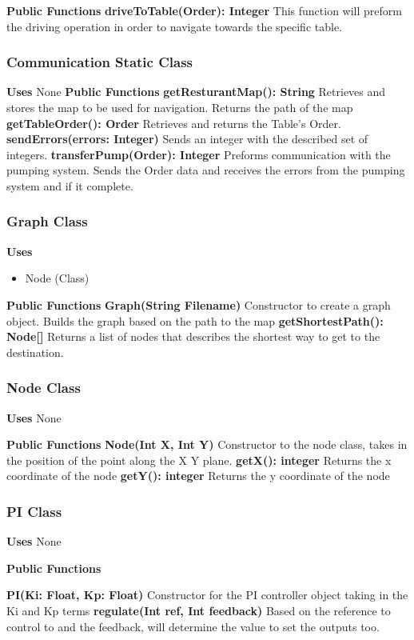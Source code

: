 \documentclass [10pt]{article}
\begin{document}
\textbf{Public Functions}
\textbf{driveToTable(Order): Integer}
This function will preform the driving operation in order to navigate towards the specific table.

\subsubsection{Communication Static Class}
\textbf{Uses}
None 
\textbf{Public Functions}
\textbf{getResturantMap(): String}
Retrieves and stores the map to be used for navigation. Returns the path of the map 
\textbf{getTableOrder(): Order}
Retrieves and returns the Table’s Order.
\textbf{sendErrors(errors: Integer)}
Sends an integer with the described set of integers. 
\textbf{transferPump(Order): Integer}
Preforms communication with the pumping system. Sends the Order data and receives the errors from the pumping system and if it complete.

\subsubsection{Graph Class}
\textbf{Uses}
\begin{itemize}
	\item Node (Class)
\end{itemize}

\textbf{Public Functions}
\textbf{Graph(String Filename)}
Constructor to create a graph object. Builds the graph based on the path to the map
\textbf{getShortestPath(): Node[]}
Returns a list of nodes that describes the shortest way to get to the destination. 


\subsubsection{Node Class}
\textbf{Uses}
None 

\textbf{Public Functions}
\textbf{Node(Int X, Int Y)}
Constructor to the node class, takes in the position of the point along the X Y plane.
\textbf{getX(): integer}
Returns the x coordinate of the node
\textbf{getY(): integer}
Returns the y coordinate of the node

\subsubsection{PI Class}
\textbf{Uses}
None 

\textbf{Public Functions}

\textbf{PI(Ki: Float, Kp: Float)}
Constructor for the PI controller object taking in the Ki and Kp terms
\textbf{regulate(Int ref, Int feedback)}
Based on the reference to control to and the feedback, will determine the value to set the outputs too.
\end{document}
